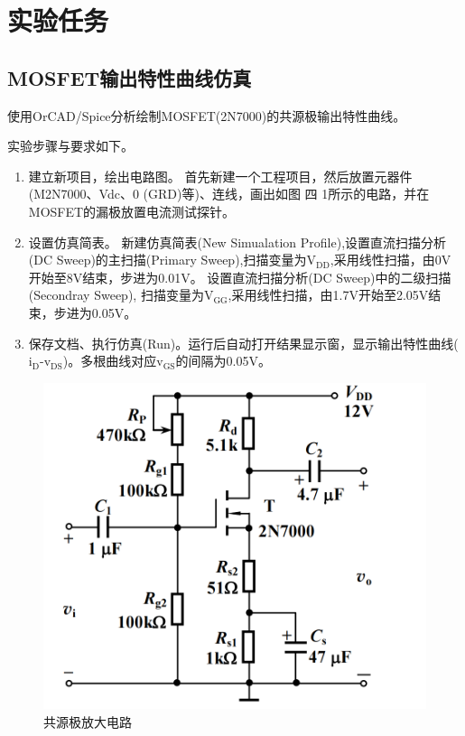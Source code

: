 \documentclass[a4paper]{article}
\theoremstyle{definition}
\theoremstyle{plain}
\theoremstyle{remark}
\begin{document}
\section{实验任务}
\subsection{MOSFET输出特性曲线仿真}
使用OrCAD/Spice分析绘制MOSFET(2N7000)的共源极输出特性曲线。

实验步骤与要求如下。
\begin{enumerate}
	\item 建立新项目，绘出电路图。
	      首先新建一个工程项目，然后放置元器件(M2N7000、Vdc、0 (GRD)等)、连线，画出如图 四 1所示的电路，并在MOSFET的漏极放置电流测试探针。
	\item 设置仿真简表。
	      新建仿真简表(New Simualation Profile),设置直流扫描分析(DC Sweep)的主扫描(Primary Sweep),扫描变量为$\mathrm{V_{DD}}$,采用线性扫描，由0V开始至8V结束，步进为0.01V。
	      设置直流扫描分析(DC Sweep)中的二级扫描(Secondray Sweep), 扫描变量为$\mathrm{V_{GG}}$,采用线性扫描，由1.7V开始至2.05V结束，步进为0.05V。
	\item 保存文档、执行仿真(Run)。运行后自动打开结果显示窗，显示输出特性曲线($\mathrm{i_D}$-$\mathrm{v_{DS}}$)。多根曲线对应$\mathrm{v_{GS}}$的间隔为0.05V。
\end{enumerate}
\begin{figure}[H]
	\centering
	\includegraphics[width=1\textwidth]{共源极放大电路}
	\caption{共源极放大电路}
	\label{共源极放大电路}
\end{figure}
\end{document}
